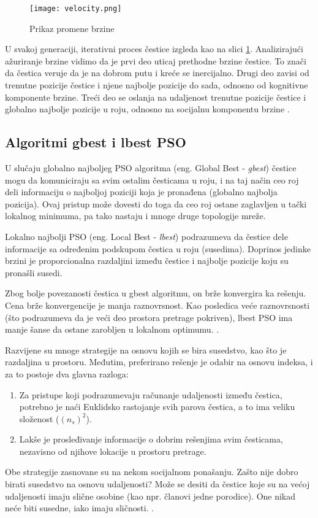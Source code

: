 \documentclass[a4paper]{article}
\begin{document}
\begin{figure}[htp]
    \centering
    \texttt{[image: velocity.png]}
    \caption{Prikaz promene brzine}
    \label{fig:velocity}
\end{figure}

U svakoj generaciji, iterativni proces čestice izgleda kao na slici \ref{fig:velocity}. Analizirajući ažuriranje brzine vidimo da je prvi deo uticaj prethodne brzine čestice. To znači da čestica veruje da je na dobrom putu i kreće se inercijalno. Drugi deo zavisi od trenutne pozicije čestice i njene najbolje pozicije do sada, odnosno od kognitivne komponente brzine. Treći deo se oslanja na udaljenost trenutne pozicije čestice i globalno najbolje pozicije u roju, odnosno na socijalnu komponentu brzine \cite{wang2018particle}. 

\subsection{Algoritmi gbest i lbest PSO}
\label{subsec:podnaslov1}

U slučaju globalno najboljeg PSO algoritma (eng. Global Best - \textit{gbest}) čestice mogu da komuniciraju sa svim ostalim česticama u roju, i na taj način ceo roj deli informaciju o najboljoj poziciji koja je pronađena (globalno najbolja pozicija). Ovaj pristup može dovesti do toga da ceo roj ostane zaglavljen u tački lokalnog minimuma, pa tako nastaju i mnoge druge topologije mreže.

Lokalno najbolji PSO (eng. Local Best - \textit{lbest}) podrazumeva da čestice dele informacije sa određenim podskupom čestica u roju (susedima). Doprinos jedinke brzini je proporcionalna razdaljini između čestice i najbolje pozicije koju su pronašli susedi. 

Zbog bolje povezanosti čestica u gbest algoritmu, on brže konvergira ka rešenju. Cena brže konvergencije je manja raznovrsnost. Kao posledica veće raznovrsnosti (što podrazumeva da je veći deo prostora pretrage pokriven), lbest PSO ima manje šanse da ostane zarobljen u lokalnom optimumu. \cite{engelbrecht2007computational}.

Razvijene su mnoge strategije na osnovu kojih se bira susedstvo, kao što je razdaljina u prostoru. Međutim, preferirano rešenje je odabir na osnovu indeksa, i za to postoje dva glavna razloga:
\begin{enumerate}
    \item Za pristupe koji podrazumevaju računanje udaljenosti između čestica, potrebno je naći Euklidsko rastojanje svih parova čestica, a to ima veliku složenost ($(n_s)^2$).
    \item Lakše je prosleđivanje informacije o dobrim rešenjima svim česticama, nezavisno od njihove lokacije u prostoru pretrage.

\end{enumerate}
Obe strategije zasnovane su na nekom socijalnom ponašanju. Zašto nije dobro birati susedstvo na osnovu udaljenosti?  Može se desiti da čestice koje su na većoj udaljenosti imaju slične osobine (kao npr. članovi jedne porodice). One nikad neće biti susedne, iako imaju sličnosti.  \cite{liu2006particle}.
    
\end{document}
